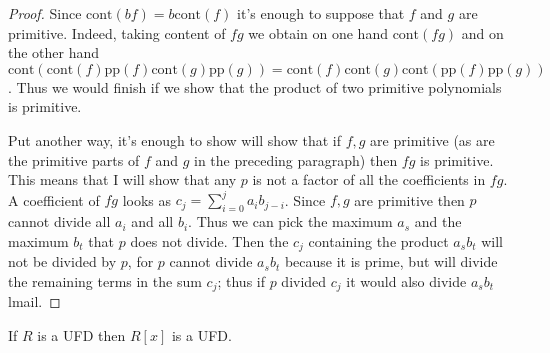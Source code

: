 \begin{proof}
Since $\text{cont}(bf)=b\text{cont}(f)$ it's enough to suppose that  $f$ and $g$
are primitive. Indeed, taking content of $fg$ we obtain on one hand
$\text{cont}(fg)$ and on the other hand
$\text{cont}(\text{cont}(f)\text{pp}(f)\text{cont}(g)\text{pp}(g))
=\text{cont}(f)\text{cont}(g)\text{cont}(\text{pp}(f)\text{pp}(g))$. 
Thus we would finish if we show that the product of two primitive polynomials is
primitive.

Put another way, it's enough to show will show that if $f,g$ are primitive (as
are the primitive parts of $f$ and $g$ in the preceding paragraph) then $fg$ is
primitive. This means that I will show that any $p$ is not a factor of all the
coefficients in $fg$. A coefficient of $fg$ looks as
$c_j=\sum_{i=0}^ja_ib_{j-i}$.  Since $f,g$ are primitive then $p$ cannot divide
all $a_i$ and all $b_i$.  Thus we can pick the maximum $a_s$ and the maximum
$b_t$ that $p$ does not divide. Then the $c_j$ containing the product $a_sb_t$
will not be divided by $p$, for $p$ cannot divide $a_sb_t$ because it is prime,
but will divide the remaining terms in the sum $c_j$; thus if $p$ divided $c_j$
it would also divide $a_sb_t$lmail.
\end{proof}

\begin{lemma}[Gauss]
\label{lemma-R-UFD-implies-R[x]-UFD}
\begin{reference}
\cite[Chapter 4, Theorem 2.3]{Lang-algebra}
\end{reference}
If $R$ is a UFD then $R[x]$ is a UFD.
\end{lemma}

